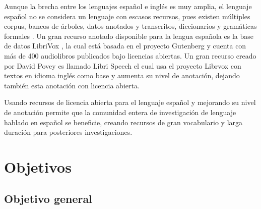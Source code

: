 Aunque la brecha entre los lenguajes español e inglés es muy amplia, el lenguaje español no se considera un lenguaje con escasos recursos, pues existen múltiples corpus, bancos de árboles, datos anotados y transcritos, diccionarios y gramáticas formales \cite{CavarGlobalGORILLA}. Un gran recurso anotado disponible para la lengua española es la base de datos LibriVox  \cite{LibriVox}, la cual está basada en el proyecto Gutenberg \cite{gutenberg} y cuenta con más de 400 audiolibros publicados bajo licencias abiertas. Un gran recurso creado por David Povey es llamado Libri Speech \cite{PanayotovLIBRISPEECH:BOOKS} el cual usa el proyecto Librvox con textos en idioma inglés como base y aumenta su nivel de anotación, dejando también esta anotación con licencia abierta.

Usando recursos de licencia abierta para el lenguaje español y mejorando su nivel de anotación permite que la comunidad entera de investigación de lenguaje hablado en español se beneficie, creando recursos de gran vocabulario y larga duración para posteriores investigaciones.

\section{Objetivos}


\subsection{Objetivo general}

